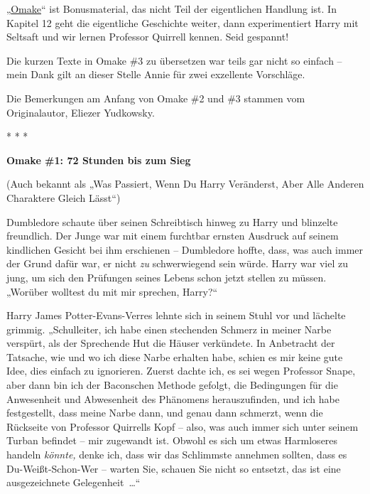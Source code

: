 

\hypertarget{omake-1-2-und-3}{%

„\href{http://www.urbandictionary.com/define.php?term=omake\&defid=27860}{Omake}“ ist Bonusmaterial, das nicht Teil der eigentlichen Handlung ist. In Kapitel 12 geht die eigentliche Geschichte weiter, dann experimentiert Harry mit Seltsaft und wir lernen Professor Quirrell kennen. Seid gespannt!

Die kurzen Texte in Omake \#3 zu übersetzen war teils gar nicht so einfach -- mein Dank gilt an dieser Stelle Annie für zwei exzellente Vorschläge.

Die Bemerkungen am Anfang von Omake \#2 und \#3 stammen vom Originalautor, Eliezer Yudkowsky.

* * *

\textbf{Omake \#1: 72 Stunden bis zum Sieg}

(Auch bekannt als „Was Passiert, Wenn Du Harry Veränderst, Aber Alle Anderen Charaktere Gleich Lässt“)

Dumbledore schaute über seinen Schreibtisch hinweg zu Harry und blinzelte freundlich. Der Junge war mit einem furchtbar ernsten Ausdruck auf seinem kindlichen Gesicht bei ihm erschienen -- Dumbledore hoffte, dass, was auch immer der Grund dafür war, er nicht \emph{zu} schwerwiegend sein würde. Harry war viel zu jung, um sich den Prüfungen seines Lebens schon jetzt stellen zu müssen. „Worüber wolltest du mit mir sprechen, Harry?“

Harry James Potter-Evans-Verres lehnte sich in seinem Stuhl vor und lächelte grimmig. „Schulleiter, ich habe einen stechenden Schmerz in meiner Narbe verspürt, als der Sprechende Hut die Häuser verkündete. In Anbetracht der Tatsache, wie und wo ich diese Narbe erhalten habe, schien es mir keine gute Idee, dies einfach zu ignorieren. Zuerst dachte ich, es sei wegen Professor Snape, aber dann bin ich der Baconschen Methode gefolgt, die Bedingungen für die Anwesenheit und Abwesenheit des Phänomens herauszufinden, und ich habe festgestellt, dass meine Narbe dann, und genau dann schmerzt, wenn die Rückseite von Professor Quirrells Kopf -- also, was auch immer sich unter seinem Turban befindet -- mir zugewandt ist. Obwohl es sich um etwas Harmloseres handeln \emph{könnte,} denke ich, dass wir das Schlimmste annehmen sollten, dass es Du-Weißt-Schon-Wer -- warten Sie, schauen Sie nicht so entsetzt, das ist eine ausgezeichnete Gelegenheit~…“

}

